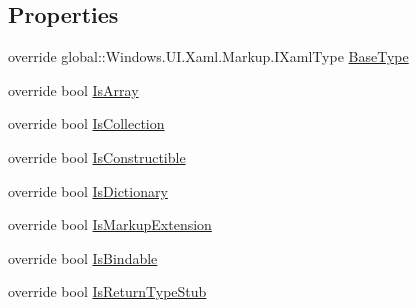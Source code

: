 \subsection*{Properties}
\begin{DoxyCompactItemize}
\item 
override global\+::\+Windows.\+U\+I.\+Xaml.\+Markup.\+I\+Xaml\+Type \hyperlink{class_e_l_i_client_1_1_e_l_i_client___xaml_type_info_1_1_xaml_user_type_ab0d34b5c2e17c392a818dcc8747c1351}{Base\+Type}
\item 
override bool \hyperlink{class_e_l_i_client_1_1_e_l_i_client___xaml_type_info_1_1_xaml_user_type_a7f347b84ab9de56c6f736dec52274fad}{Is\+Array}
\item 
override bool \hyperlink{class_e_l_i_client_1_1_e_l_i_client___xaml_type_info_1_1_xaml_user_type_a31d530c029a73e65facc90b713342e4a}{Is\+Collection}
\item 
override bool \hyperlink{class_e_l_i_client_1_1_e_l_i_client___xaml_type_info_1_1_xaml_user_type_a55a65f26b5a296c0013f8efb2e453922}{Is\+Constructible}
\item 
override bool \hyperlink{class_e_l_i_client_1_1_e_l_i_client___xaml_type_info_1_1_xaml_user_type_aed8e8c4b08bef82dfcccb04c6eea1b1c}{Is\+Dictionary}
\item 
override bool \hyperlink{class_e_l_i_client_1_1_e_l_i_client___xaml_type_info_1_1_xaml_user_type_ad30a8eb44faaee7035c8831c1e418665}{Is\+Markup\+Extension}
\item 
override bool \hyperlink{class_e_l_i_client_1_1_e_l_i_client___xaml_type_info_1_1_xaml_user_type_a3b1c6981a4cd4c1e2ac06e965d94771c}{Is\+Bindable}
\item 
override bool \hyperlink{class_e_l_i_client_1_1_e_l_i_client___xaml_type_info_1_1_xaml_user_type_abcde259b1fe6328983d6a85de8e0e312}{Is\+Return\+Type\+Stub}
\item 

\end{DoxyCompactItemize}
